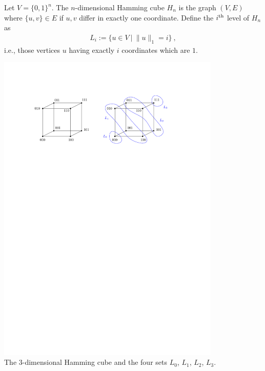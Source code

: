 \documentclass[11pt,a4paper,oneside]{article}
\newcommand{\nth}[1]{#1\textsuperscript{th}}
\newcommand{\norm}[1]{\|#1\|}
\begin{document}
Let $V = \{0,1\}^n$. The $n$-dimensional Hamming cube $H_n$ is the graph $(V,E)$ where
$\{u,v\} \in E$ if $u,v$ differ in exactly one coordinate.
Define the $\nth{i}$ level of $H_n$ as 
\begin{align*}
  L_i := \{u \in V \ | \ \norm{u}_1 = i \} \ ,
\end{align*}
i.e., those vertices $u$ having exactly $i$ coordinates which are $1$.
\begin{center}
  \includegraphics[width=0.8\textwidth]{figures/hamming-3-dim.pdf}\\
  {\small The $3$-dimensional Hamming cube and the four 
    sets $L_0$, $L_1$, $L_2$, $L_3$.}
\end{center}
\end{document}
